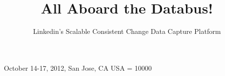 \documentclass{sig-alternate}
\begin{document}
 {October 14-17, 2012, San Jose, CA USA} 
\widowpenalty = 10000

\title{All Aboard the Databus!}
\subtitle{Linkedin's Scalable Consistent Change Data Capture Platform}
%
%
%
%
%

\def\sharedaffiliation{%
\end{tabular}
\begin{tabular}{c}}
\end{document}
